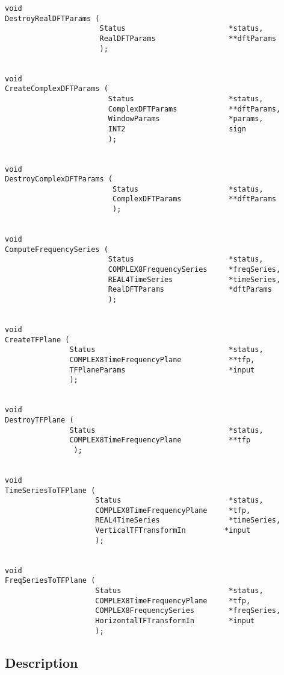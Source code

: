 \documentclass{article}
\begin{document}
\begin{verbatim}
void
DestroyRealDFTParams (
                      Status                        *status, 
                      RealDFTParams                 **dftParams
                      );


void
CreateComplexDFTParams ( 
                        Status                      *status, 
                        ComplexDFTParams            **dftParams, 
                        WindowParams                *params,
                        INT2                        sign
                        );


void
DestroyComplexDFTParams (
                         Status                     *status, 
                         ComplexDFTParams           **dftParams
                         );


void
ComputeFrequencySeries (
                        Status                      *status,
                        COMPLEX8FrequencySeries     *freqSeries,
                        REAL4TimeSeries             *timeSeries,
                        RealDFTParams               *dftParams
                        );


void
CreateTFPlane (
               Status                               *status,
               COMPLEX8TimeFrequencyPlane           **tfp,
               TFPlaneParams                        *input
               );


void
DestroyTFPlane (
               Status                               *status,
               COMPLEX8TimeFrequencyPlane           **tfp
                );


void
TimeSeriesToTFPlane (
                     Status                         *status,
                     COMPLEX8TimeFrequencyPlane     *tfp,
                     REAL4TimeSeries                *timeSeries,
                     VerticalTFTransformIn         *input
                     );


void
FreqSeriesToTFPlane (
                     Status                         *status,
                     COMPLEX8TimeFrequencyPlane     *tfp,
                     COMPLEX8FrequencySeries        *freqSeries,
                     HorizontalTFTransformIn        *input
                     );
\end{verbatim}



\subsection{Description}
\end{document}

